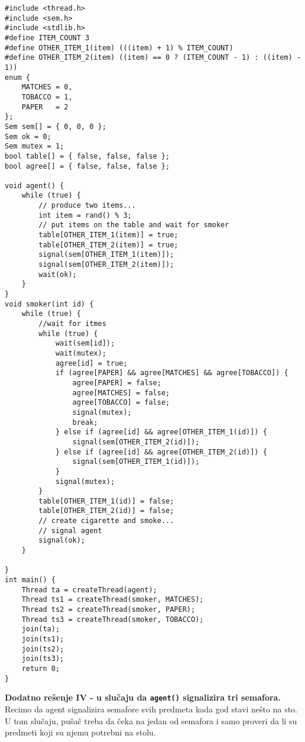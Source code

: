 \begin{lstlisting}
#include <thread.h>
#include <sem.h>
#include <stdlib.h>
#define ITEM_COUNT 3
#define OTHER_ITEM_1(item) (((item) + 1) % ITEM_COUNT)
#define OTHER_ITEM_2(item) ((item) == 0 ? (ITEM_COUNT - 1) : ((item) - 1))
enum {
    MATCHES = 0,
    TOBACCO = 1,
    PAPER   = 2
};
Sem sem[] = { 0, 0, 0 };
Sem ok = 0;
Sem mutex = 1;
bool table[] = { false, false, false };
bool agree[] = { false, false, false };

void agent() {
    while (true) {
        // produce two items...
        int item = rand() % 3;
        // put items on the table and wait for smoker
        table[OTHER_ITEM_1(item)] = true;
        table[OTHER_ITEM_2(item)] = true;
        signal(sem[OTHER_ITEM_1(item)]);
        signal(sem[OTHER_ITEM_2(item)]);
        wait(ok);
    }
}
void smoker(int id) {
    while (true) {
        //wait for itmes
        while (true) {
            wait(sem[id]);
            wait(mutex);
            agree[id] = true;
            if (agree[PAPER] && agree[MATCHES] && agree[TOBACCO]) {
                agree[PAPER] = false;
                agree[MATCHES] = false;
                agree[TOBACCO] = false;
                signal(mutex);
                break;
            } else if (agree[id] && agree[OTHER_ITEM_1(id)]) {
                signal(sem[OTHER_ITEM_2(id)]);
            } else if (agree[id] && agree[OTHER_ITEM_2(id)]) {
                signal(sem[OTHER_ITEM_1(id)]);
            }
            signal(mutex);
        }
        table[OTHER_ITEM_1(id)] = false;
        table[OTHER_ITEM_2(id)] = false;
        // create cigarette and smoke...
        // signal agent
        signal(ok);
    }
    
}
int main() {
    Thread ta = createThread(agent);
    Thread ts1 = createThread(smoker, MATCHES);
    Thread ts2 = createThread(smoker, PAPER);
    Thread ts3 = createThread(smoker, TOBACCO);
    join(ta);
    join(ts1);
    join(ts2);
    join(ts3);
    return 0;
}

\end{lstlisting}
\textbf{\large Dodatno re\v{s}enje IV - u slu\v{c}aju da \texttt{agent()} signalizira tri semafora.}\\
Recimo da agent signalizira semafore svih predmeta kada god stavi ne\v{s}to na sto. U tom slu\v{c}aju, pu\v{s}a\v{c} treba da \v{c}eka na jedan od semafora i samo proveri da li su predmeti koji su njemu potrebni na stolu.
